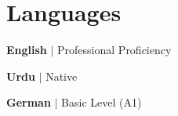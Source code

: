 
\section{Languages}
\resumeSubHeadingListStart
\small{
\item{\textbf{English} $|$ Professional Proficiency}
\item{\textbf{Urdu}    $|$ Native}
\item{\textbf{German}  $|$ Basic Level (A1)}
}
\resumeSubHeadingListEnd
